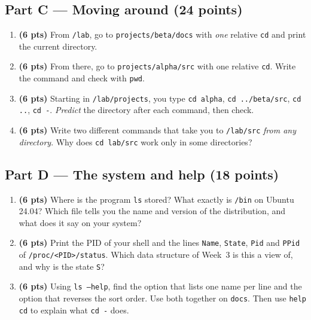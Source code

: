 \documentclass[11pt,a4paper]{article}
\newcommand{\cmd}[1]{\texttt{#1}}
\begin{document}
\subsection*{Part C --- Moving around (24 points)}
\begin{enumerate}[label=\textbf{C\arabic*}, leftmargin=2.2em, start=9]
  \item \textbf{(6 pts)} From \texttt{\tl/lab}, go to \texttt{projects/beta/docs} with \emph{one} relative \cmd{cd} and print the current directory.
  \item \textbf{(6 pts)} From there, go to \texttt{projects/alpha/src} with one relative \cmd{cd}. Write the command and check with \cmd{pwd}.
  \item \textbf{(6 pts)} Starting in \texttt{\tl/lab/projects}, you type \cmd{cd alpha}, \cmd{cd ../beta/src}, \cmd{cd ..}, \cmd{cd -}. \emph{Predict} the directory after each command, then check.
  \item \textbf{(6 pts)} Write two different commands that take you to \texttt{\tl/lab/src} \emph{from any directory}. Why does \cmd{cd lab/src} work only in some directories?
\end{enumerate}

\subsection*{Part D --- The system and help (18 points)}
\begin{enumerate}[label=\textbf{D\arabic*}, leftmargin=2.2em, start=13]
  \item \textbf{(6 pts)} Where is the program \cmd{ls} stored? What exactly is \texttt{/bin} on Ubuntu 24.04? Which file tells you the name and version of the distribution, and what does it say on your system?
  \item \textbf{(6 pts)} Print the PID of your shell and the lines \texttt{Name}, \texttt{State}, \texttt{Pid} and \texttt{PPid} of \texttt{/proc/<PID>/status}. Which data structure of Week~3 is this a view of, and why is the state \texttt{S}?
  \item \textbf{(6 pts)} Using \cmd{ls --help}, find the option that lists one name per line and the option that reverses the sort order. Use both together on \texttt{docs}. Then use \cmd{help cd} to explain what \cmd{cd -} does.
\end{enumerate}
\end{document}
